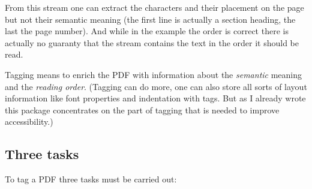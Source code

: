 \documentclass[DIV=12,parskip=half-,bibliography=totoc]{scrartcl}
\newcommand\PDF{PDF}
\begin{document}
From this stream one can extract the characters and their placement on the page but not their semantic meaning  (the first line is actually a section heading, the last the page number). And while in the example the order is correct there is actually no guaranty that the stream contains the text in the order it should be read.

Tagging means to enrich the \PDF{} with information about the \emph{semantic} meaning and the \emph{reading order}. (Tagging can do more, one can also store all sorts of layout information like font properties and indentation with tags. But as I already wrote this package concentrates on the part of tagging that is needed to improve accessibility.)




\subsection{Three tasks}



To tag a \PDF{} three tasks must be  carried out:
\end{document}

